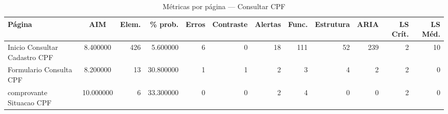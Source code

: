 \begin{table}[htbp]
  \centering
  \caption{Métricas por página — Consultar CPF}
  \label{tab:flow_consultar_cpf}
  \small
  \begin{tabular}{lcrrrrrrrrrr}
\toprule
Página & AIM & Elem. & \% prob. & Erros & Contraste & Alertas & Func. & Estrutura & ARIA & LS Crít. & LS Méd. \\
\midrule
Inicio Consultar Cadastro CPF & 8.400000 & 426 & 5.600000 & 6 & 0 & 18 & 111 & 52 & 239 & 2 & 10 \\
Formulario Consulta CPF & 8.200000 & 13 & 30.800000 & 1 & 1 & 2 & 3 & 4 & 2 & 2 & 0 \\
comprovante Situacao CPF & 10.000000 & 6 & 33.300000 & 0 & 0 & 2 & 4 & 0 & 0 & 2 & 0 \\
\bottomrule
\end{tabular}
\end{table}
